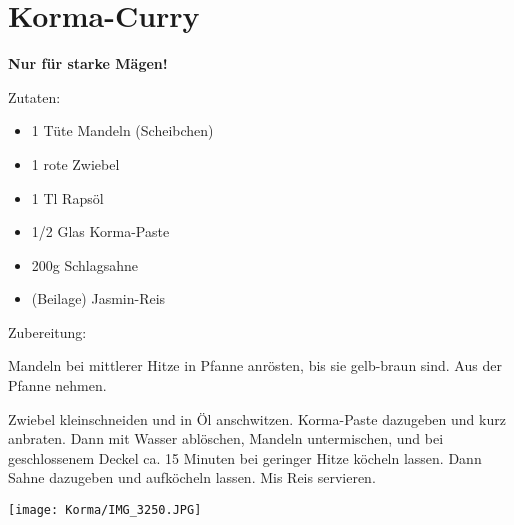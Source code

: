 \section{Korma-Curry}
\textbf{Nur für starke Mägen!}

Zutaten:
\begin{itemize}
    \item 1 Tüte Mandeln (Scheibchen)
    \item 1 rote Zwiebel
    \item 1 Tl Rapsöl
    \item 1/2 Glas Korma-Paste
    \item 200g Schlagsahne
    \item (Beilage) Jasmin-Reis
\end{itemize}

\noindent Zubereitung:

\noindent Mandeln bei mittlerer Hitze in Pfanne anrösten, bis sie gelb-braun sind. Aus der Pfanne nehmen.

Zwiebel kleinschneiden und in Öl anschwitzen. Korma-Paste dazugeben und kurz anbraten. Dann mit Wasser ablöschen, Mandeln untermischen, und bei geschlossenem Deckel ca. 15 Minuten bei geringer Hitze köcheln lassen. Dann Sahne dazugeben und aufköcheln lassen. Mis Reis servieren.

\newpage
\mbox{}
\vfill
\begin{center}
    \texttt{[image: Korma/IMG\_3250.JPG]}
\end{center}
\vfill
\mbox{ }
\newpage
